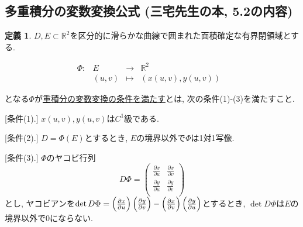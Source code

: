 \documentclass[dvipdfmx,a4paper,11pt]{article}
\newcommand{\R}{\mathbb{R}}
\theoremstyle{definition}
\newtheorem{dfn}[thm]{定義}
\newcommand{\pdrv}[2]{\frac{\partial #1}{\partial #2}}
\begin{document}
\subsection{多重積分の変数変換公式  (三宅先生の本, 5.2の内容)}
 \label{2_3}
 \begin{tcolorbox}[
    colback = white,
    colframe = green!35!black,
    fonttitle = \bfseries,
    breakable = true]
    \begin{dfn}
    \label{hensuuhenkann}
$D, E \subset \R^2$を区分的に滑らかな曲線で囲まれた面積確定な有界閉領域とする. 

 $$
\begin{array}{ccccc}
\Phi: &E & \rightarrow & \R^2 & \\
&(u,v) & \longmapsto & (x(u,v),y(u,v))&
\end{array}
$$

となる$\Phi$が\underline{重積分の変数変換の条件を満たす}とは, 次の条件(1)-(3)を満たすこと.

[条件(1).] $x(u,v),y(u,v)$は$C^1$級である.

[条件(2).] $D = \Phi(E)$とするとき, $E$の境界以外で$\Phi$は1対1写像. 

[条件(3).] $\Phi$のヤコビ行列
$$
D\Phi=
\left(\begin{array}{cc} \pdrv{x}{u} & \pdrv{x}{v} \\ \pdrv{y}{u}& \pdrv{y}{v} \\ \end{array} \right)
$$ 
とし, ヤコビアンを$\det D\Phi = 
\Bigl( \pdrv{x}{u} \Bigr) \left( \pdrv{y}{v} \right) - \Bigl( \pdrv{x}{v}  \Bigr) \left( \pdrv{y}{u}\right)$とするとき, $\det D\Phi $は$E$の境界以外で0にならない.
 \end{dfn}
 \end{tcolorbox}
\end{document}
